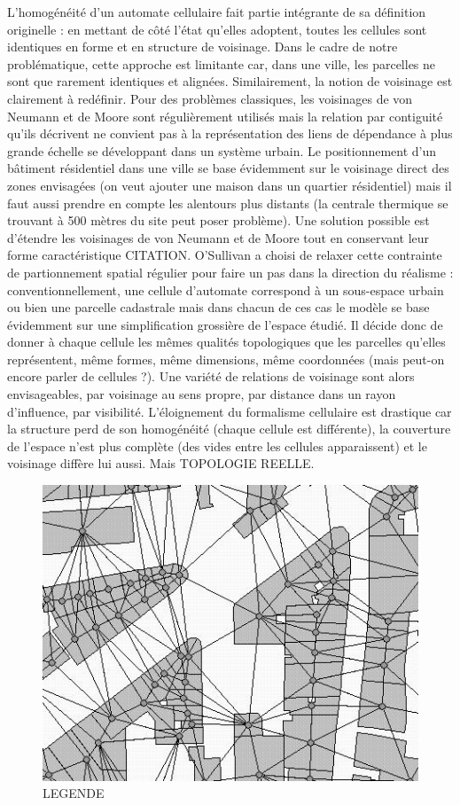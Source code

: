\documentclass[12pt]{article}
\begin{document}
L'homogénéité d'un automate cellulaire fait partie intégrante de sa
définition originelle : en mettant de côté l'état qu'elles adoptent,
toutes les cellules sont identiques en forme et en structure de
voisinage. Dans le cadre de notre problématique, cette approche est
limitante car, dans une ville, les parcelles ne sont que rarement
identiques et alignées. Similairement, la notion de voisinage est
clairement à redéfinir. Pour des problèmes classiques, les voisinages
de von Neumann et de Moore sont régulièrement utilisés mais la
relation par contiguité qu'ils décrivent ne convient pas à la
représentation des liens de dépendance à plus grande échelle se
développant dans un système urbain. Le positionnement d'un bâtiment
résidentiel dans une ville se base évidemment sur le voisinage direct
des zones envisagées (on veut ajouter une maison dans un quartier
résidentiel) mais il faut aussi prendre en compte les alentours plus
distants (la centrale thermique se trouvant à 500 mètres du site peut
poser problème). Une solution possible est d'étendre les voisinages de
von Neumann et de Moore tout en conservant leur forme caractéristique
CITATION. O'Sullivan a choisi de relaxer cette contrainte de
partionnement spatial régulier pour faire un pas dans la direction du
réalisme \cite{O'Sullivan2000,O'Sullivan2001} : conventionnellement,
une cellule d'automate correspond à un sous-espace urbain ou bien une
parcelle cadastrale mais dans chacun de ces cas le modèle se base
évidemment sur une simplification grossière de l'espace étudié. Il
décide donc de donner à chaque cellule les mêmes qualités topologiques
que les parcelles qu'elles représentent, même formes, même dimensions,
même coordonnées (mais peut-on encore parler de cellules ?). Une
variété de relations de voisinage sont alors envisageables, par
voisinage au sens propre, par distance dans un rayon d'influence, par
visibilité. L'éloignement du formalisme cellulaire est drastique car
la structure perd de son homogénéité (chaque cellule est différente),
la couverture de l'espace n'est plus complète (des vides entre les
cellules apparaissent) et le voisinage diffère lui aussi. Mais
TOPOLOGIE REELLE.

\begin{figure}
  \centering
  \includegraphics[width=.6\linewidth]{images/gca.png}
  \caption{LEGENDE \cite{O'Sullivan2000}}
  \label{fig:sullivan}
\end{figure}
\end{document}
